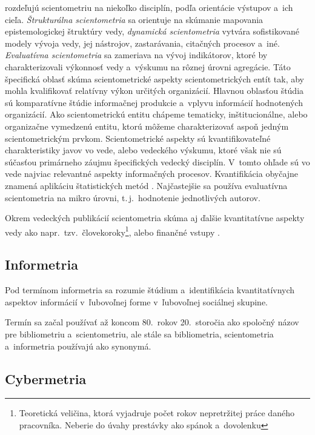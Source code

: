 \citet{Glanzel2004} rozdeľujú scientometriu na niekoľko disciplín, podľa
orientácie výstupov a~ich cieľa.  \emph{Štrukturálna scientometria} sa orientuje
na skúmanie mapovania epistemologickej štruktúry vedy, \emph{dynamická
  scientometria} vytvára sofistikované modely vývoja vedy, jej nástrojov,
zastarávania, citačných procesov a~iné.  \emph{Evaluatívna scientometria} sa
zameriava na vývoj indikátorov, ktoré by charakterizovali výkonnosť vedy
a~výskumu na rôznej úrovni agregácie.  Táto špecifická oblasť skúma
scientometrické aspekty scientometrických entít tak, aby mohla kvalifikovať
relatívny výkon určitých organizácií.  Hlavnou oblasťou štúdia sú komparatívne
štúdie informačnej produkcie a~vplyvu informácií hodnotených organizácií.  Ako
scientometrickú entitu chápeme tematicky, inštitucionálne, alebo organizačne
vymedzenú entitu, ktorú môžeme charakterizovať aspoň jedným scientometrickým
prvkom.  Scientometrické aspekty sú kvantifikovateľné charakteristiky javov vo
vede, alebo vedeckého výskumu, ktoré však nie sú súčasťou primárneho záujmu
špecifických vedecký disciplín.  V~tomto ohľade sú vo vede najviac relevantné
aspekty informačných procesov.  Kvantifikácia obyčajne znamená aplikáciu
štatistických metód \citep{Vinkler2001}.  Najčastejšie sa používa evaluatívna
scientometria na mikro úrovni, t.\,j.~hodnotenie jednotlivých autorov.

Okrem vedeckých publikácií scientometria skúma aj ďalšie kvantitatívne aspekty
vedy ako napr.~tzv.~človekoroky\footnote{Teoretická veličina, ktorá vyjadruje
  počet rokov nepretržitej práce daného pracovníka.  Neberie do úvahy prestávky
  ako spánok a~dovolenku}, alebo finančné vstupy \citep{Bellis2009}.


\subsection{Informetria}

Pod termínom informetria sa rozumie štúdium a~identifikácia kvantitatívnych
aspektov informácií v~ľubovoľnej forme v~ľubovoľnej sociálnej skupine.

Termín sa začal používať až koncom 80.~rokov 20.~storočia ako spoločný názov
pre bibliometriu a~scientometriu, ale stále sa bibliometria, scientometria
a~informetria používajú ako synonymá.


\subsection{Cybermetria}


